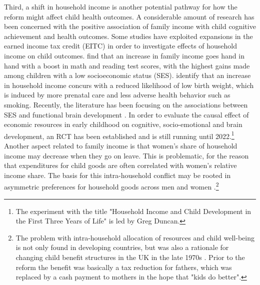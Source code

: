 \documentclass[11pt, a4paper]{article} %
\begin{document}
Third, a shift in household income is another potential pathway for how the reform might affect child health outcomes. A considerable amount of research has been concerned with the positive association of family income with child cognitive achievement and health outcomes. Some studies have exploited expansions in the earned income tax credit (EITC) in order to investigate effects of household income on child outcomes. \cite{dahl2012impact} find that an increase in family income goes hand in hand with a boost in math and reading test scores, with the highest gains made among children with a low socioeconomic status (SES). \cite{hoynes2015income} identify that an increase in household income concurs with a reduced likelihood of low birth weight, which is induced by more prenatal care and less adverse health behavior such as smoking. Recently, the literature has been focusing on the associations between SES and functional brain development \citep{tomalski2013}. In order to evaluate the causal effect of economic resources in early childhood on cognitive, socio-emotional and brain development, an RCT has been established and is still running until 2022.\footnote{The experiment with the title "Household Income and Child Development in the First Three Years of Life" is led by Greg Duncan.}  \newline
Another aspect related to family income is that women's share of household income may decrease when they go on leave. This is problematic, for the reason that expenditures for child goods are often correlated with women's relative income share. The basis for this intra-household conflict may be rooted in asymmetric preferences for household goods across men and women \citep{anderson2002economics}.\footnote{The problem with intra-household allocation of resources and child well-being is not only found in developing countries, but was also a rationale for changing child benefit structures in the UK in the late 1970s \citep{lundberg1996bargaining}. Prior to the reform the benefit was basically a tax reduction for fathers, which was replaced by a cash payment to mothers in the hope that "kids do better".}\newline
\end{document}
